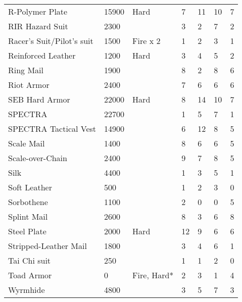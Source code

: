 \documentclass[twoside]{book}
\begin{document}
\begin{longtable}{p{1.25in}llp{2em}p{2em}p{2em}p{2em}}
      \raggedright R-Polymer Plate&15900&Hard&7&11&10&7\tabularnewline
      \raggedright RIR Hazard Suit&2300&&3&2&7&2\tabularnewline
      \raggedright Racer's Suit/Pilot's suit&1500&Fire x 2&1&2&3&1\tabularnewline
      \raggedright Reinforced Leather&1200&Hard&3&4&5&2\tabularnewline
      \raggedright Ring Mail&1900&&8&2&8&6\tabularnewline
      \raggedright Riot Armor&2400&&7&6&6&6\tabularnewline
      \raggedright SEB Hard Armor&22000&Hard&8&14&10&7\tabularnewline
      \raggedright SPECTRA&22700&&1&5&7&1\tabularnewline
      \raggedright SPECTRA Tactical Vest&14900&&6&12&8&5\tabularnewline
      \raggedright Scale Mail&1400&&8&6&6&5\tabularnewline
      \raggedright Scale-over-Chain&2400&&9&7&8&5\tabularnewline
      \raggedright Silk&4400&&1&3&5&1\tabularnewline
      \raggedright Soft Leather&500&&1&2&3&0\tabularnewline
      \raggedright Sorbothene&1100&&2&0&0&5\tabularnewline
      \raggedright Splint Mail&2600&&8&3&6&8\tabularnewline
      \raggedright Steel Plate&2000&Hard&12&9&6&6\tabularnewline
      \raggedright Stripped-Leather Mail&1800&&3&4&6&1\tabularnewline
      \raggedright Tai Chi suit&250&&1&1&2&0\tabularnewline
      \raggedright Toad Armor&0&Fire, Hard*&2&3&1&4\tabularnewline
      \raggedright Wyrmhide&4800&&3&5&7&3\tabularnewline
      
\end{longtable}
    
\end{document}
